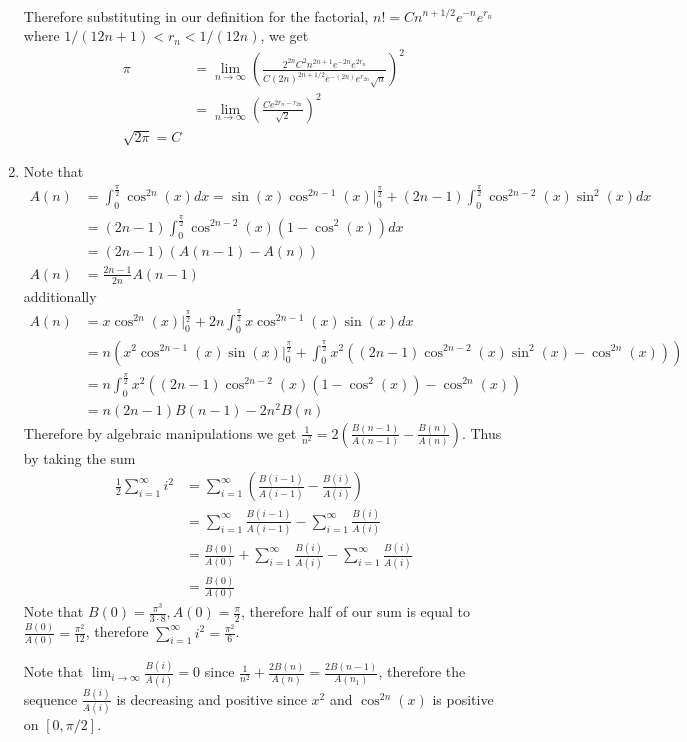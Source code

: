 \documentclass[12pt, letterpaper]{article}
\begin{document}
\begin{enumerate}
\begin{align*}
	\end{align*}
	Therefore substituting in our definition for the factorial, $n! = Cn^{n + 1/2}e^{-n}e^{r_n}$ where $1/(12n + 1) < r_n < 1/(12n)$, we get 
	\begin{align*}
		\pi &= \lim_{n \to \infty} \left(\frac{2^{2n}C^2 n^{2n + 1}e^{-2n}e^{2r_n}}{C(2n)^{2n+1/2}e^{-(2n)}e^{r_{2n}}\sqrt{n}}\right)^2\\
		&= \lim_{n \to \infty}  \left( \frac{Ce^{2r_n - r_{2n}}}{\sqrt{2}}\right)^2\\
		\sqrt{2\pi} = C
	\end{align*}
	\item Note that 
	\begin{align*}
	A(n) &= \int_0^{\frac{\pi}{2}}\cos^{2n}(x) dx = \sin(x)\cos^{2n-1}(x)|_{0}^\frac{\pi}{2} + (2n-1)\int_0^{\frac{\pi}{2}}\cos^{2n-2}(x)\sin^2(x) dx\\
	&= (2n-1)\int_0^{\frac{\pi}{2}}\cos^{2n-2}(x)(1-\cos^2(x)) dx\\
	&= (2n-1)(A(n-1) - A(n))\\
	A(n) &= \frac{2n-1}{2n}A(n-1)
	\end{align*}
	additionally 
	\begin{align*}
			A(n) &= x \cos^{2n}(x)|_{0}^{\frac{\pi}{2}} + 2n \int_0^{\frac{\pi}{2}} x \cos^{2n-1}(x) \sin(x)dx\\
			&= n \left( x^2 \cos^{2n-1}(x) \sin(x) |_0^{\frac{\pi}{2}} + \int_0^{\frac{\pi}{2}}  x^2 ((2n-1)\cos^{2n-2}(x) \sin^2(x) - \cos^{2n}(x))\right)	\\
			&= n\int_0^{\frac{\pi}{2}}  x^2 ((2n-1)\cos^{2n-2}(x) (1-\cos^2(x)) - \cos^{2n}(x))	\\
			&= n(2n-1)B(n-1) - 2n^2 B(n)
	\end{align*}
	Therefore by algebraic manipulations we get $\frac{1}{n^2} = 2\left( \frac{B(n-1)}{A(n-1)} - \frac{B(n)}{A(n)} \right)$.
	Thus by taking the sum 
	\begin{align*}
		\frac{1}{2}\sum_{i=1}^\infty i^2 &= \sum_{i=1}^\infty \left( \frac{B(i-1)}{A(i-1)} - \frac{B(i)}{A(i)} \right)\\
		&= \sum_{i=1}^\infty \frac{B(i-1)}{A(i-1)} - \sum_{i=1}^\infty \frac{B(i)}{A(i)}\\
		&= \frac{B(0)}{A(0)} + \sum_{i=1}^\infty \frac{B(i)}{A(i)} - \sum_{i=1}^\infty \frac{B(i)}{A(i)}\\
		&= \frac{B(0)}{A(0)}
	\end{align*}
	Note that $B(0) = \frac{\pi^3}{3\cdot 8}, A(0) = \frac{\pi}{2}$, therefore half of our sum is equal to 
	$\frac{B(0)}{A(0)} = \frac{\pi^2}{12}$, therefore $\sum_{i = 1}^\infty i^2 = \frac{\pi^2}{6}$.
	
	Note that $\lim_{i \to \infty} \frac{B(i)}{A(i)} = 0$ since $\frac{1}{n^2} + \frac{2B(n)}{A(n)} = \frac{2B(n-1)}{A(n_1)}$, therefore the sequence $\frac{B(i)}{A(i)}$ is decreasing and positive since $x^2$ and $\cos^{2n}(x)$ is positive on $[0,\pi/2]$.  
\end{enumerate}
\end{document}
